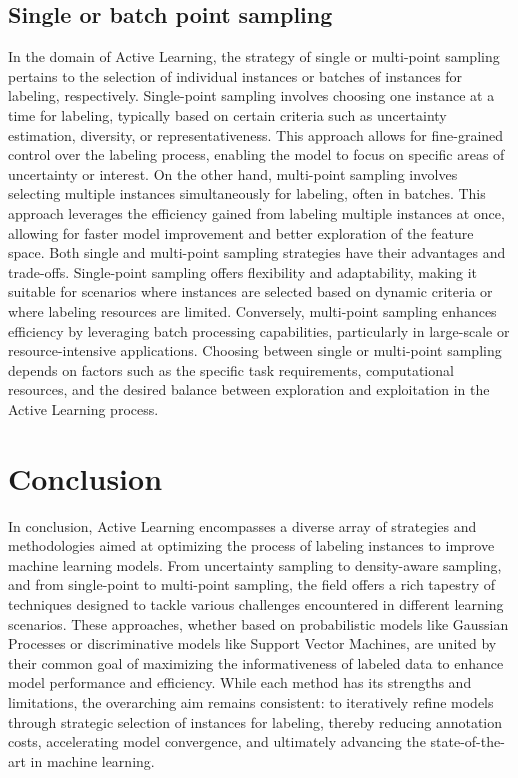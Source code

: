 \documentclass[11pt]{article}
\begin{document}
\subsection{Single or batch point sampling}
In the domain of Active Learning, the strategy of single or multi-point sampling pertains to the selection of individual instances or batches of instances for labeling, respectively. Single-point sampling involves choosing one instance at a time for labeling, typically based on certain criteria such as uncertainty estimation, diversity, or representativeness. This approach allows for fine-grained control over the labeling process, enabling the model to focus on specific areas of uncertainty or interest. On the other hand, multi-point sampling involves selecting multiple instances simultaneously for labeling, often in batches. This approach leverages the efficiency gained from labeling multiple instances at once\cite{brinker_incorporating_2003}\cite{xu_incorporating_2007}, allowing for faster model improvement and better exploration of the feature space. Both single and multi-point sampling strategies have their advantages and trade-offs. Single-point sampling offers flexibility and adaptability, making it suitable for scenarios where instances are selected based on dynamic criteria or where labeling resources are limited. Conversely, multi-point sampling enhances efficiency by leveraging batch processing capabilities, particularly in large-scale or resource-intensive applications. Choosing between single or multi-point sampling depends on factors such as the specific task requirements, computational resources, and the desired balance between exploration and exploitation in the Active Learning process.

\section{Conclusion}
In conclusion, Active Learning encompasses a diverse array of strategies and methodologies aimed at optimizing the process of labeling instances to improve machine learning models. From uncertainty sampling to density-aware sampling, and from single-point to multi-point sampling, the field offers a rich tapestry of techniques designed to tackle various challenges encountered in different learning scenarios. These approaches, whether based on probabilistic models like Gaussian Processes or discriminative models like Support Vector Machines, are united by their common goal of maximizing the informativeness of labeled data to enhance model performance and efficiency. While each method has its strengths and limitations, the overarching aim remains consistent: to iteratively refine models through strategic selection of instances for labeling, thereby reducing annotation costs, accelerating model convergence, and ultimately advancing the state-of-the-art in machine learning.
\end{document}

